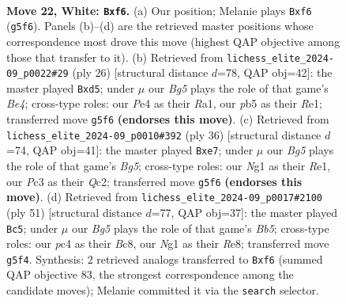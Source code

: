 \documentclass[11pt]{article}
\begin{document}
\begin{figure}[p]
\label{fig:thought-m40}
\end{figure}

\clearpage

\begin{figure}[p]\centering
\begin{subfigure}{0.46\textwidth}\centering
\resizebox{\linewidth}{!}{%
\newchessgame
\chessboard[
  setfen={2r3k1/1bqn1p1p/r4bp1/pp1Pp1B1/2p1P3/1BP3P1/P3KP1P/R1Q3NR w - - 0 22},
  showmover=false,
  pgfstyle=straightmove, color=movearrow, markmove={g5-f6}
]}
\caption{}
\end{subfigure}\hfill
\begin{subfigure}{0.46\textwidth}\centering
\resizebox{\linewidth}{!}{%
\newchessgame
\chessboard[
  setfen={r2q1rk1/1p2ppbp/n1p3p1/p2b4/P2PB2N/2P3P1/1P3P1P/R1BQR1K1 w - - 1 14},
  showmover=false,
  pgfstyle=straightmove, color=movearrow, markmove={e4-d5}
]}
\caption{}
\end{subfigure}
\\[4pt]
\begin{subfigure}{0.46\textwidth}\centering
\resizebox{\linewidth}{!}{%
\newchessgame
\chessboard[
  setfen={r3r1k1/p1q1bpp1/1pp1b3/5pBp/2PP3n/2NB3P/PPQ2PP1/R3R1K1 w - - 6 19},
  showmover=false,
  pgfstyle=straightmove, color=movearrow, markmove={g5-e7}
]}
\caption{}
\end{subfigure}\hfill
\begin{subfigure}{0.46\textwidth}\centering
\resizebox{\linewidth}{!}{%
\newchessgame
\chessboard[
  setfen={r1b1r1k1/3nqp2/1p2p2p/p3P1p1/Pb1RP3/N3B1P1/1PQ2PBP/2R3K1 b - - 1 26},
  showmover=false,
  pgfstyle=straightmove, color=movearrow, markmove={b4-c5}
]}
\caption{}
\end{subfigure}
\caption{\textbf{Move 22, White: \texttt{Bxf6}.} (a) Our position; Melanie plays \texttt{Bxf6} (\texttt{g5f6}). Panels (b)--(d) are the retrieved master positions whose correspondence most drove this move (highest QAP objective among those that transfer to it). (b) Retrieved from \texttt{lichess\_elite\_2024-09\_p0022\#29} (ply 26) [structural distance $d$=78, QAP obj=42]: the master played \texttt{Bxd5}; under $\mu$ our \emph{Bg5} plays the role of that game's \emph{Be4}; cross-type roles: our \emph{P}e4 as their \emph{R}a1, our \emph{p}b5 as their \emph{R}e1; transferred move \texttt{g5f6} \textbf{(endorses this move)}. (c) Retrieved from \texttt{lichess\_elite\_2024-09\_p0010\#392} (ply 36) [structural distance $d$=74, QAP obj=41]: the master played \texttt{Bxe7}; under $\mu$ our \emph{Bg5} plays the role of that game's \emph{Bg5}; cross-type roles: our \emph{N}g1 as their \emph{R}e1, our \emph{P}c3 as their \emph{Q}c2; transferred move \texttt{g5f6} \textbf{(endorses this move)}. (d) Retrieved from \texttt{lichess\_elite\_2024-09\_p0017\#2100} (ply 51) [structural distance $d$=77, QAP obj=37]: the master played \texttt{Bc5}; under $\mu$ our \emph{Bg5} plays the role of that game's \emph{Bb5}; cross-type roles: our \emph{p}c4 as their \emph{B}c8, our \emph{N}g1 as their \emph{R}e8; transferred move \texttt{g5f4}. Synthesis: 2 retrieved analogs transferred to \texttt{Bxf6} (summed QAP objective 83, the strongest correspondence among the candidate moves); Melanie committed it via the \texttt{search} selector.}

\end{figure}
\end{document}
